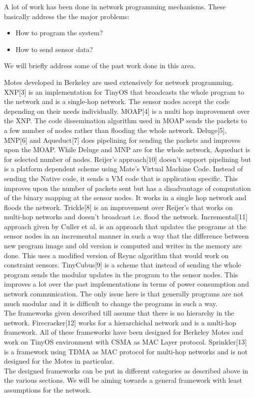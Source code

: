 \documentclass[twocolumn]{article}
\begin{document}
A lot of work has been done in network programming mechanisms. These basically address the the major problems:
\begin{itemize}
\item How to program the system?
\item How to send sensor data?
\end{itemize}
We will briefly address some of the past work done in this area.

Motes developed in Berkeley are used extensively for network programming. XNP[3] is an implementation for TinyOS that broadcasts the whole program to the network and is a single-hop network. The sensor nodes accept the code depending on their needs individually. MOAP[4] is a multi hop improvement over the XNP. The code dissemination algorithm used in MOAP sends the packets to a few number of nodes rather than flooding the whole network. Deluge[5], MNP[6] and Aqueduct[7] does pipelining for sending the packets and improves upon the MOAP. While Deluge and MNP are for the whole network, Aqueduct is for selected number of nodes. Reijer's approach[10] doesn't support pipelining but is a platform dependent scheme using Mate's Virtual Machine Code. Instead of sending the Native code, it sends a VM code that is application specific. This improves upon the number of packets sent but has a disadvantage of computation of the binary mapping at the sensor nodes. It works in a single hop network and floods the network. Trickle[8] is an improvement over Reijer's that works on multi-hop networks and doesn't broadcast i.e. flood the network. Incremental[11] approach given by Culler et al. is an approach that updates the programs at the sensor nodes in an incremental manner in such a way that the difference between new program image and old version is computed and writes in the memory are done. This uses a modified version of Rsync algorithm that would work on constraint sensors. TinyCubus[9] is a scheme that instead of sending the whole program sends the modular updates in the program to the sensor nodes. This improves a lot over the past implementations in terms of power consumption and network communication. The only issue here is that generally programs are not much modular and it is difficult to change the programs in such a way.
\\
The frameworks given described till assume that there is no hierarchy in the network. Firecracker[12] works for a hierarchichal network and is a multi-hop framework. All of these frameworks have been designed for Berkeley Motes and work on TinyOS environment with CSMA as MAC Layer protocol. Sprinkler[13] is a framework using TDMA as MAC protocol for multi-hop networks and is not designed for the Motes in particular.
\\
The designed frameworks can be put in different categories as described above in the various sections. We will be aiming towards a general framework with least assumptions for the network.
\end{document}
